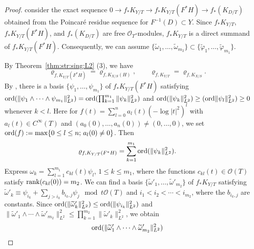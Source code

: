 \documentclass[amscd, leqno]{amsart}
\theoremstyle{plain}
\theoremstyle{definition}
\theoremstyle{remark}
\newenvironment{pf}{\begin{proof}}{\end{proof}}
\begin{document}
\begin{pf}
consider the exact sequence $0 \to f_{*}K_{Y/T} \to f_{*}K_{Y/T}(F^{*}H) \to f_{*}(K_{D/T})$
obtained from the Poincar\'e residue sequence for $F^{-1}(D) \subset Y$. 
Since $f_{*}K_{Y/T}$, $f_{*}K_{Y/T}(F^{*}H)$, and $f_{*}(K_{D/T})$ are free ${\mathcal O}_{T}$-modules,
$f_{*}K_{Y/T}$ is a direct summand of $f_{*}K_{Y/T}(F^{*}H)$. Consequently, we can assume 
$\{ \widetilde{\omega}_{1}, \ldots, \widetilde{\omega}_{m_{2}} \} \subset \{ \widetilde{\varphi}_{1}, \ldots, \widetilde{\varphi}_{m_{1}} \}$. 
\par
By Theorem~\ref{thm:str:sing:L2} (3), we have
\begin{equation}
\label{eqn:loglog:0}
\varrho_{f,K_{Y/T}(F^{*}H)} = \varrho_{f,K_{X/S}(H)},  \qquad  \varrho_{f,K_{Y/T}} = \varrho_{f,K_{X/S}}.
\end{equation}
By \cite[Lemma~5.2]{Takayama22}, there is a basis $\{ \psi_{1}, \ldots, \psi_{m_{1}} \}$ of $f_{*}K_{Y/T}(F^{*}H)$ satisfying
${\rm ord}(\| \psi_{1} \wedge\cdots\wedge \psi_{m_1}\|_{L^{2}}^{2}) = {\rm ord}(\prod_{k=1}^{m_{1}} \| \psi_{k} \|_{L^{2}}^{2})$ 
and ${\rm ord} (\| \psi_{k} \|_{L^{2}}^{2}) \geq ({\rm ord} \| \psi_{l} \|_{L^{2}}^{2}) \geq 0$ whenever $k < l$. 
Here for $f(t) = \sum_{l=0}^{n} a_{l}(t) (-\log |t|^{2}) ^{l}$ with $a_{l}(t)\in C^{\infty}(T)$ and $(a_{0}(0),\ldots,a_{n}(0))\not=(0,\ldots,0)$, 
we set ${\rm ord} (f) := \max\{ 0\leq l \leq n;\, a_{l}(0) \not= 0\}$. Then
\begin{equation}
\label{eqn:loglog:1}
\varrho_{f,K_{Y/T}(F^{*}H)} = \sum_{k=1}^{m_{1}} {\rm ord} (\| \psi_{k} \|_{L^{2}}^{2}).
\end{equation}
Express $\omega_{k} = \sum_{l=1}^{m_{1}} c_{kl}(t) \psi_{l}$, $1\leq k \leq m_{1}$, 
where the functions $c_{kl}(t) \in {\mathcal O}(T)$ satisfy ${\rm rank}( c_{kl}(0) ) = m_{2}$. 
We can find a basis $\{ \widetilde{\omega}'_{1}, \ldots, \widetilde{\omega}'_{m_{2}} \}$ of $f_{*}K_{Y/T}$ 
satisfying $\widetilde{\omega}'_{k} \equiv \psi_{i_{k}} + \sum_{j>i_{k}} b_{i_{k},j} \psi_{j} \mod t{\mathcal O}(T)$ 
and $i_{1}<i_{2}<\cdots<i_{m_{2}}$, where the $b_{i_{k},j}$ are constants. 
Since ${\rm ord}(  \| \widetilde{\omega}'_{k} \|_{L^{2}}^{2}) \leq {\rm ord}(  \| \psi_{i_k} \|_{L^{2}}^{2})$
and $\| \widetilde{\omega}'_{1} \wedge\cdots\wedge \widetilde{\omega}'_{m_{2}} \|_{L^{2}}^{2} \leq 
\prod_{k=1}^{m_{2}} \| \widetilde{\omega}'_{k} \|_{L^{2}}^{2}$, 
we obtain
\begin{equation}
\label{eqn:loglog:2}
{\rm ord} (\| \widetilde{\omega}'_{1} \wedge\cdots\wedge \widetilde{\omega}'_{m_{2}} \|_{L^{2}}^{2} )

\end{equation}
\end{pf}
\end{document}
